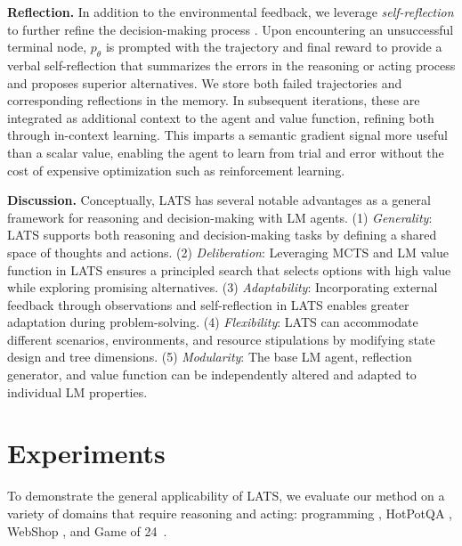 \documentclass{article}
\newcommand{\yxw}[1]{\textcolor{blue}{[{\bf yxw:} #1]}}
\newcommand{\kai}[1]{\textcolor{purple}{[{\bf kai:} #1]}}
\theoremstyle{plain}
\theoremstyle{definition}
\theoremstyle{remark}
\begin{document}
\textbf{Reflection.}
In addition to the environmental feedback, we leverage \textit{self-reflection} to further refine the decision-making process \citep{shinn2023reflexion, madaan2023selfrefine}. Upon encountering an unsuccessful terminal node, $p_\theta$ is prompted with the trajectory and final reward to provide a verbal self-reflection that summarizes the errors in the reasoning or acting process and proposes superior alternatives. We store both failed trajectories and corresponding reflections in the memory. In subsequent iterations, these are integrated as additional context to the agent and value function, refining both through in-context learning. This imparts a semantic gradient signal more useful than a scalar value, enabling the agent to learn from trial and error without the cost of expensive optimization such as reinforcement learning.

\textbf{Discussion.} Conceptually, LATS has several notable advantages as a general framework for reasoning and decision-making with LM agents.
(1) \textit{Generality}: LATS supports both reasoning and decision-making tasks by defining a shared space of thoughts and actions. (2) \textit{Deliberation}:  Leveraging MCTS and LM value function in LATS ensures a principled search that selects options with high value while exploring promising alternatives. (3) \textit{Adaptability}: Incorporating external feedback through observations and self-reflection in LATS enables greater adaptation during problem-solving. (4) \textit{Flexibility}: LATS can accommodate different scenarios, environments, and resource stipulations by modifying state design and tree dimensions. (5) \textit{Modularity}: The base LM agent, reflection generator, and value function can be independently altered and adapted to individual LM properties.




\section{Experiments}
\label{sec:exp}

To demonstrate the general applicability of LATS, we evaluate our method on a variety of domains that require reasoning and acting: programming \citep{chen2021evaluating, austin2021program}, HotPotQA \citep{yang2018hotpotqa}, WebShop \citep{yao2022webshop}, and Game of 24~\cite{yao2023tree}.
\end{document}
